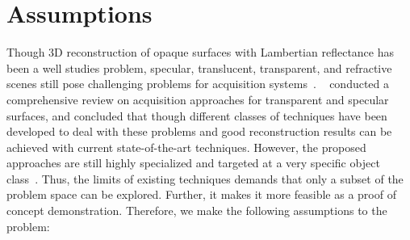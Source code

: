 
\section{Assumptions}
\label{sec:assumptions}
Though 3D reconstruction of opaque surfaces with Lambertian reflectance has been a well studies problem, specular, translucent, transparent, and refractive scenes still pose challenging problems for acquisition systems~\cite{ihrke2010transparent}. ~\citeauthor{ihrke2010transparent} conducted a comprehensive review on acquisition approaches for transparent and specular surfaces, and concluded that though different classes of techniques have been developed to deal with these problems and good reconstruction results can be achieved with current state-of-the-art techniques. However, the proposed approaches are still highly specialized and targeted at a very specific object class~\cite{ihrke2010transparent}. Thus, the limits of existing techniques demands that only a subset of the problem space can be explored. Further, it makes it more feasible as a proof of concept demonstration. Therefore, we make the following assumptions to the problem:

